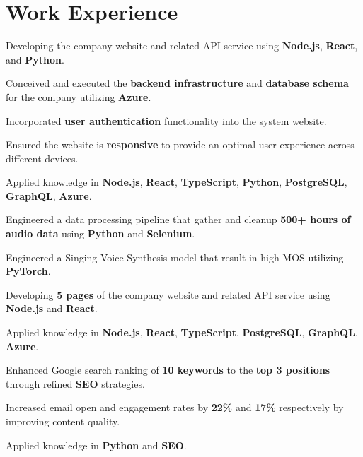 \documentclass[a4paper,10pt]{article}
\begin{document}
\newcommand{\dvd}[0]{\hspace{3pt}\vrule\hspace{3pt}}
\section{Work Experience}
\dvd{}
\begin{tightitemize}
  \item Developing the company website and related API service using \textbf{Node.js}, \textbf{React}, and \textbf{Python}.
  \item Conceived and executed the \textbf{backend infrastructure} and \textbf{database schema} for the company utilizing \textbf{Azure}.
  \item Incorporated \textbf{user authentication} functionality into the system website.
  \item Ensured the website is \textbf{responsive} to provide an optimal user experience across different devices.
  \item Applied knowledge in \textbf{Node.js}, \textbf{React}, \textbf{TypeScript}, \textbf{Python}, \textbf{PostgreSQL}, \textbf{GraphQL}, \textbf{Azure}.
\end{tightitemize}

\dvd{}
\begin{tightitemize}
  \item Engineered a data processing pipeline that gather and cleanup \textbf{500+ hours of audio data} using \textbf{Python} and \textbf{Selenium}.
  \item Engineered a Singing Voice Synthesis model that result in high MOS utilizing \textbf{PyTorch}.
  \item Developing \textbf{5 pages} of the company website and related API service using \textbf{Node.js} and \textbf{React}.
  \item Applied knowledge in \textbf{Node.js}, \textbf{React}, \textbf{TypeScript}, \textbf{PostgreSQL}, \textbf{GraphQL}, \textbf{Azure}.
\end{tightitemize}

\dvd{}

\begin{tightitemize}
  \item Enhanced Google search ranking of \textbf{10 keywords} to the \textbf{top 3 positions} through refined \textbf{SEO} strategies.
  \item Increased email open and engagement rates by \textbf{22\%} and \textbf{17\%} respectively by improving content quality.
  \item Applied knowledge in \textbf{Python} and \textbf{SEO}.
\end{tightitemize}
\end{document}
